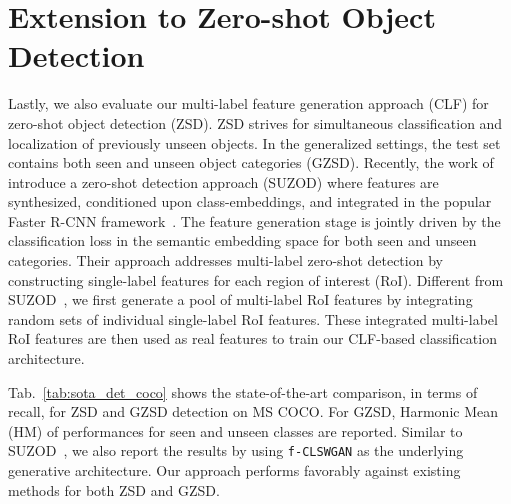 \documentclass[final]{cvpr}
\newcommand{\clswgan}{\texttt{f-CLSWGAN}}
\begin{document}
\section{Extension to Zero-shot Object Detection\label{sec:obj_det}}
Lastly, we also evaluate our multi-label feature generation approach (CLF) for zero-shot object detection (ZSD). ZSD strives for simultaneous classification and localization of previously unseen objects. In the generalized settings, the test set contains both seen and unseen object categories (GZSD). Recently, the work of~\cite{hayat2020synthesizing} introduce a zero-shot detection approach (SUZOD) where features are synthesized, conditioned upon class-embeddings, and integrated in the popular Faster R-CNN framework~\cite{ren2015faster}. The feature generation stage is jointly driven by the classification loss in the semantic embedding space for both seen and unseen categories. Their approach addresses multi-label zero-shot detection by constructing single-label features for each region of interest (RoI). Different from SUZOD~\cite{hayat2020synthesizing}, we first generate a pool of multi-label RoI features by integrating random sets of individual single-label RoI features. These integrated multi-label RoI features are then used as real features to train our CLF-based classification architecture.  

Tab.~\ref{tab:sota_det_coco} shows the state-of-the-art comparison, in terms of recall, for ZSD and GZSD detection on MS COCO. For GZSD, Harmonic Mean (HM) of performances for seen and unseen classes are reported. Similar to SUZOD~\cite{hayat2020synthesizing}, we also report the results by using \clswgan{} as the underlying generative architecture. Our approach performs favorably against existing methods for both ZSD and GZSD. 
\end{document}
